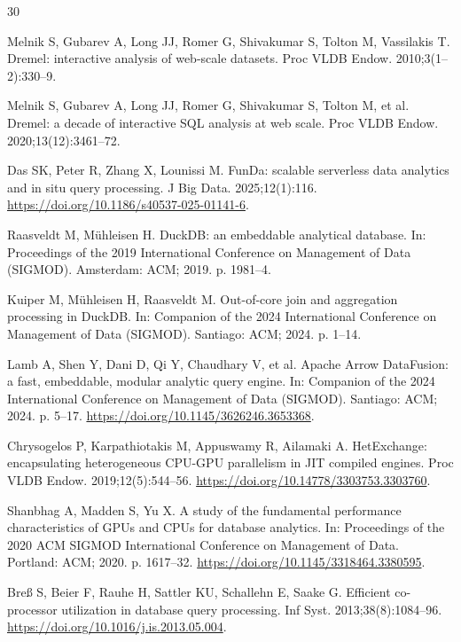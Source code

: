 \documentclass[10pt,a4paper]{article}
\begin{document}
{\sloppy
\begin{thebibliography}{30}
\small

Melnik S, Gubarev A, Long JJ, Romer G, Shivakumar S, Tolton M, Vassilakis T. Dremel: interactive analysis of web-scale datasets. Proc VLDB Endow. 2010;3(1--2):330--9.

Melnik S, Gubarev A, Long JJ, Romer G, Shivakumar S, Tolton M, et al. Dremel: a decade of interactive SQL analysis at web scale. Proc VLDB Endow. 2020;13(12):3461--72.

Das SK, Peter R, Zhang X, Lounissi M. FunDa: scalable serverless data analytics and in situ query processing. J Big Data. 2025;12(1):116. \url{https://doi.org/10.1186/s40537-025-01141-6}.

Raasveldt M, M{\"u}hleisen H. DuckDB: an embeddable analytical database. In: Proceedings of the 2019 International Conference on Management of Data (SIGMOD). Amsterdam: ACM; 2019. p. 1981--4.

Kuiper M, M{\"u}hleisen H, Raasveldt M. Out-of-core join and aggregation processing in DuckDB. In: Companion of the 2024 International Conference on Management of Data (SIGMOD). Santiago: ACM; 2024. p. 1--14.

Lamb A, Shen Y, Dani D, Qi Y, Chaudhary V, et al. Apache Arrow DataFusion: a fast, embeddable, modular analytic query engine. In: Companion of the 2024 International Conference on Management of Data (SIGMOD). Santiago: ACM; 2024. p. 5--17. \url{https://doi.org/10.1145/3626246.3653368}.

Chrysogelos P, Karpathiotakis M, Appuswamy R, Ailamaki A. HetExchange: encapsulating heterogeneous CPU-GPU parallelism in JIT compiled engines. Proc VLDB Endow. 2019;12(5):544--56. \url{https://doi.org/10.14778/3303753.3303760}.

Shanbhag A, Madden S, Yu X. A study of the fundamental performance characteristics of GPUs and CPUs for database analytics. In: Proceedings of the 2020 ACM SIGMOD International Conference on Management of Data. Portland: ACM; 2020. p. 1617--32. \url{https://doi.org/10.1145/3318464.3380595}.

Bre{\ss} S, Beier F, Rauhe H, Sattler KU, Schallehn E, Saake G. Efficient co-processor utilization in database query processing. Inf Syst. 2013;38(8):1084--96. \url{https://doi.org/10.1016/j.is.2013.05.004}.


\end{thebibliography}}
\end{document}
